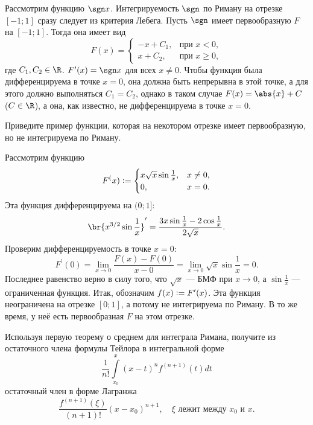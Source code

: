 \begin{solution}
    Рассмотрим функцию $\sgn x$. Интегрируемость $\sgn$ по Риману на отрезке $[-1; 1]$ сразу следует из критерия Лебега. Пусть $\sgn$ имеет первообразную $F$ на $[-1; 1]$. Тогда она имеет вид
    \[
        F(x) =
        \begin{cases}
            -x + C_1,&\text{при $x < 0$},\\
            x + C_2,&\text{при $x \geqslant 0$},
        \end{cases}
    \]
    где $C_1, C_2 \in \R$. $F^\prime(x) = \sgn x$ для всех $x \ne 0$. Чтобы функция была дифференцируема в точке $x = 0$, она должна быть непрерывна в этой точке, а для этого должно выполняться $C_1 = C_2$, однако в таком случае $F(x) = \abs{x} + C$ ($C \in \R$), а она, как известно, не дифференцируема в точке $x = 0$.
\end{solution}

\begin{problem}[13$^\circ$]
    Приведите пример функции, которая на некотором отрезке имеет первообразную, но не интегрируема по Риману.
\end{problem}

\begin{solution}
    Рассмотрим функцию 
    \[
        F^(x) \vcentcolon = 
        \begin{cases}
            x\sqrt{x}\sin\frac{1}{x},& x \ne 0,\\
            0,& x = 0.
        \end{cases}
    \]
    Эта функция дифференцируема на $(0; 1]$:
    \[
        \br{x^{3 / 2}\sin\frac{1}{x}}^\prime = \frac{3x\sin\frac{1}{x} - 2\cos\frac{1}{x}}{2\sqrt{x}}.
    \]
    Проверим дифференцируемость в точке $x = 0$:
    \[
        F^\prime(0) = \lim_{x \to 0}\frac{F(x) - F(0)}{x - 0} = \lim_{x \to 0}\sqrt{x}\sin\frac{1}{x} = 0.
    \]
    Последнее равенство верно в силу того, что $\sqrt{x}$ --- БМФ при $x \to 0$, а $\sin\frac{1}{x}$ --- ограниченная функция. Итак, обозначим $f(x) \vcentcolon = F^\prime(x)$. Эта функция неограничена на отрезке $[0; 1]$, а потому не интегрируема по Риману. В то же время, у неё есть первообразная $F$ на этом отрезке.
\end{solution}

\begin{problem}[15$^\circ$]
    Используя первую теорему о среднем для интеграла Римана, получите из остаточного члена формулы Тейлора в интегральной форме
    \[
        \frac{1}{n!}\int\limits_{x_0}^x(x - t)^nf^{(n + 1)}(t)dt
    \]
    остаточный член в форме Лагранжа
    \[
        \frac{f^{(n + 1)}(\xi)}{(n + 1)!}(x - x_0)^{n + 1},\quad\text{$\xi$ лежит между $x_0$ и $x$}.
    \]
\end{problem}

